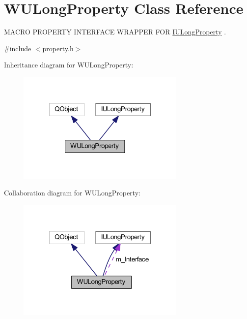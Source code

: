 \hypertarget{class_w_u_long_property}{\section{W\-U\-Long\-Property Class Reference}
\label{class_w_u_long_property}
}


M\-A\-C\-R\-O P\-R\-O\-P\-E\-R\-T\-Y I\-N\-T\-E\-R\-F\-A\-C\-E W\-R\-A\-P\-P\-E\-R F\-O\-R \hyperlink{class_i_u_long_property}{I\-U\-Long\-Property} .  




{\ttfamily \#include $<$property.\-h$>$}



Inheritance diagram for W\-U\-Long\-Property\-:
\nopagebreak
\begin{figure}[H]
\begin{center}
\leavevmode
\includegraphics[width=233pt]{class_w_u_long_property__inherit__graph}
\end{center}
\end{figure}


Collaboration diagram for W\-U\-Long\-Property\-:
\nopagebreak
\begin{figure}[H]
\begin{center}
\leavevmode
\includegraphics[width=233pt]{class_w_u_long_property__coll__graph}
\end{center}
\end{figure}
